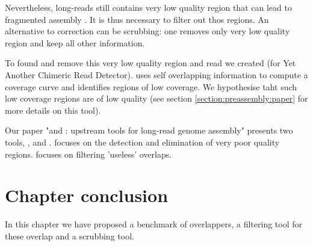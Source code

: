 \documentclass[main.tex]{subfiles}
\begin{document}
 Nevertheless, long-reads still contains very low quality region \cite{blog_post_error_repartition} that can lead to fragmented assembly \cite{long_read_assembler_comparison}. It is thus necessary to filter out thos regions. An alternative to correction can be scrubbing: one removes only very low quality region and keep all other information.

To found and remove this very low quality region and read we created \yacrd (for Yet Another Chimeric Read Detector). \yacrd uses self overlapping information to compute a coverage curve and identifies regions of low coverage. We hypothesise taht such low coverage regions are of low quality (see section \ref{section:preassembly:paper} for more details on this tool).

Our paper "\yacrd and \fpa: upstream tools for long-read genome assembly" presents two tools, \yacrd , and \fpa. \yacrd focuses on the detection and elimination of very poor quality regions. \fpa focuses on filtering 'useless' overlaps.



\section{Chapter conclusion}

In this chapter we have proposed a benchmark of overlappers, a filtering tool for these overlap and a scrubbing tool.
\end{document}
